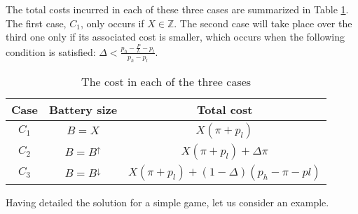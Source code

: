 The total costs incurred in each of these three cases are summarized in  Table \ref{tab:bat_cases}. The first case, $C_1$, only occurs if $X \in \mathbb{Z}$. The second case will take place over the third one only if its associated cost is smaller, which occurs when the following condition is satisfied: $  \Delta < \frac{p_h - \frac{P}{L} - p_l}{p_h - p_l}$.

\begin{table}[htpb]
	\centering
	\caption{The cost in each of the three cases}
	\label{tab:bat_cases}
  \begin{tabular}{c|c|c}
    Case & Battery size & Total cost \\ \hline
    \toprule
		$C_1$ & $B=X$ & $X (\pi + p_l)$ \\ \hline
		$C_2$ & $B = B^{\uparrow}$ & $X (\pi + p_l) + \Delta \pi$ \\ \hline
		$C_3$ & $B = B^{\downarrow}$ & $X (\pi + p_l) + (1-\Delta)(p_h -\pi - pl)$ \\ \hline
	\end{tabular}
\end{table}

Having detailed the solution for a simple game, let us consider an example.

